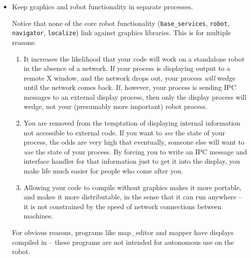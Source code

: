 \documentclass{article}
\begin{document}
\begin{itemize}

\item Keep graphics and robot functionality in separate processes. 
  
  Notice that none of the core robot functionality (\verb!base_services!,
  \verb!robot!, \verb!navigator!, \verb!localize!) link against graphics
  libraries. This is for multiple reasons:
  
  \begin{enumerate}
  \item It increases the likelihood that your code will work on a standalone
    robot in the absence of a network. If your process is displaying output to
    a remote X window, and the network drops out, your process \emph{will}
    wedge until the network comes back. If, however, your process is sending
    IPC messages to an external display process, then only the display process
    will wedge, not your (presumably more important) robot process.
    
  \item You are removed from the temptation of displaying internal information
    not accessible to external code. If you want to \emph{see} the state of
    your process, the odds are very high that eventually, someone else will
    want to \emph{use} the state of your process. By forcing you to write an
    IPC message and interface handler for that information just to get it into
    the display, you make life much easier for people who come after you.
    
  \item Allowing your code to compile without graphics makes it more portable,
    and makes it more distributable, in the sense that it can run anywhere --
    it is not constrained by the speed of network connections between
    machines.
  \end{enumerate}
  
  For obvious reasons, programs like map\_editor and mapper have displays
  compiled in -- these programs are not intended for autonomous use on the
  robot.
\end{itemize}
\end{document}
